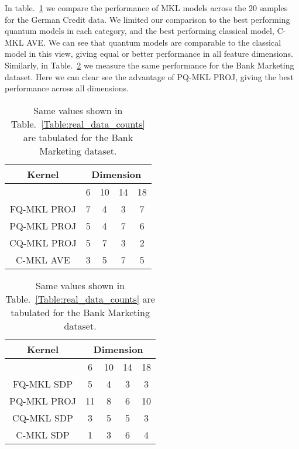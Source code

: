 \documentclass[reprint,amsfonts, amssymb, amsmath,  showkeys, nofootinbib,pra, superscriptaddress, twocolumn,longbibliography]{revtex4-2}
\begin{document}
In table.~\ref{Table:german_numeric_counts} we compare the performance of MKL models across the 20 samples for the German Credit data. We limited our comparison to the best performing quantum models in each category, and the best performing classical model, C-MKL AVE.
We can see that quantum models are comparable to the classical model in this view, giving equal or better performance in all feature dimensions. 
Similarly, in Table.~\ref{Table:bank_marketing_counts} we measure the same performance for the Bank Marketing dataset. Here we can clear see the advantage of PQ-MKL PROJ, giving the best performance across all dimensions.

\begin{table}[!htbp]
\centering
\begin{tabular}{*5c}
\toprule
Kernel &  \multicolumn{4}{c}{Dimension} \\
\midrule
{}  & 6 & 10 & 14 & 18  \\
FQ-MKL PROJ & 7 & 4 & 3 & 7 \\
PQ-MKL PROJ & 5 & 4 & 7 & 6 \\
CQ-MKL PROJ & 5 & 7 & 3 & 2 \\
C-MKL AVE   & 3 & 5 & 7 & 5 \\
\bottomrule
\end{tabular}
\caption{\label{Table:german_numeric_counts}
Same values shown in Table.~\ref{Table:real_data_counts} are tabulated for the Bank Marketing dataset.}
\end{table}

\begin{table}[!htbp]
\centering
\begin{tabular}{*5c}
\toprule
Kernel &  \multicolumn{4}{c}{Dimension} \\
\midrule
{} & 6 & 10 & 14 & 18  \\
FQ-MKL SDP & 5 & 4 & 3 & 3 \\
PQ-MKL PROJ & 11 & 8 & 6 & 10 \\
CQ-MKL SDP & 3 & 5 & 5 & 3 \\
C-MKL SDP  & 1 & 3 & 6 & 4 \\
\bottomrule
\end{tabular}
\caption{\label{Table:bank_marketing_counts}
Same values shown in Table.~\ref{Table:real_data_counts} are tabulated for the Bank Marketing dataset.
}
\end{table}
\end{document}
